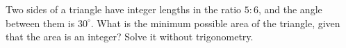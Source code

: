 Two sides of a triangle have integer lengths in the ratio $5:6$, and the angle between them is $30^\circ$. What is the minimum possible area of the triangle, given that the area is an integer? Solve it without trigonometry.
